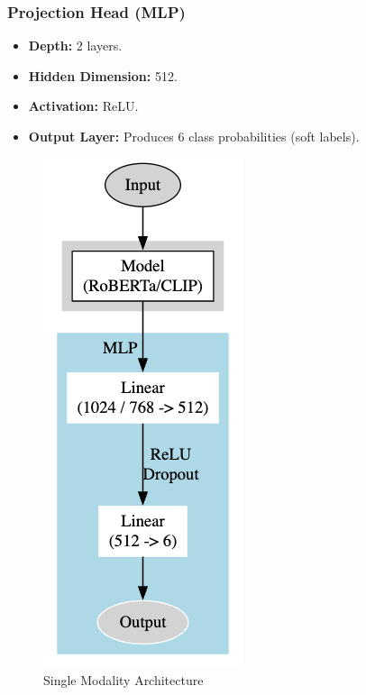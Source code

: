 \subsubsection*{Projection Head (MLP)}
\begin{itemize}
    \item \textbf{Depth:} 2 layers.
    \item \textbf{Hidden Dimension:} 512.
    \item \textbf{Activation:} ReLU.
    \item \textbf{Output Layer:} Produces $6$ class probabilities (soft labels).
\end{itemize}


\begin{figure}[h]
    \centering
    \begin{minipage}{0.49\textwidth}
        \centering
        \includegraphics[height=0.5\textheight]{images/unimodal.png}
        \caption{Single Modality Architecture}
        \label{fig:arch1}
    \end{minipage}
    \hfill
    \begin{minipage}{0.49\textwidth}
        \centering

\end{minipage}
\end{figure}
